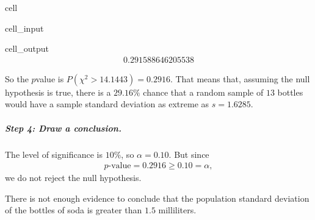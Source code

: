 \documentclass[letterpaper,10pt,english]{jupyterBook}
\begin{document}
\begin{sphinxuseclass}{cell}\begin{sphinxVerbatimInput}

\begin{sphinxuseclass}{cell_input}
\begin{sphinxVerbatim}[commandchars=\\\{\}]
\end{sphinxVerbatim}

\end{sphinxuseclass}\end{sphinxVerbatimInput}
\begin{sphinxVerbatimOutput}

\begin{sphinxuseclass}{cell_output}\begin{equation*}
\begin{split}0.291588646205538\end{split}
\end{equation*}
\end{sphinxuseclass}\end{sphinxVerbatimOutput}

\end{sphinxuseclass}
\sphinxAtStartPar
So the \(p\)\sphinxhyphen{}value is \(P(\chi^2 > 14.1443) = 0.2916\). That means that, assuming the null hypothesis is true, there is a \(29.16\%\) chance that a random sample of \(13\) bottles would have a sample standard deviation as extreme as \(s = 1.6285\).


\subparagraph{Step 4: Draw a conclusion.}
\label{\detokenize{Ch7 The Chi-Square Distribution/7.2 Hypothesis Testing for the Population Variance:step-4-draw-a-conclusion}}
\sphinxAtStartPar
The level of significance is \(10\%\), so \(\alpha = 0.10\). But since
\begin{equation*}
\begin{split}p\text{-value} = 0.2916 \geq 0.10 = \alpha, \end{split}
\end{equation*}
\sphinxAtStartPar
we do not reject the null hypothesis.

\sphinxAtStartPar
There is not enough evidence to conclude that the population standard deviation of the bottles of soda is greater than \(1.5\) milliliters.
\end{document}
